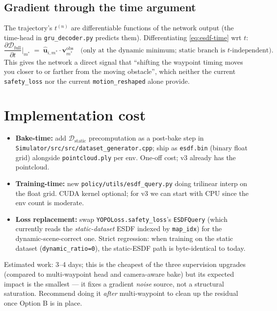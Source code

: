 \documentclass[11pt]{article}
\newcommand{\esdf}{\mathcal{D}}
\begin{document}
\subsection{Gradient through the time argument}

The trajectory's $t^{(n)}$ are differentiable functions of the network output
(the time-head in \texttt{gru\_decoder.py} predicts them). Differentiating
\eqref{eq:esdf-time} wrt $t$:
\begin{equation}
\frac{\partial \esdf_{\text{full}}}{\partial t}\Big|_{m^*}
\;=\;
\hat{\bm{u}}_{i,m^*} \cdot \bm{v}_{m^*}^{\text{obs}}
\quad
\text{(only at the dynamic minimum; static branch is }t\text{-independent)}.
\end{equation}
This gives the network a direct signal that ``shifting the waypoint timing
moves you closer to or farther from the moving obstacle'', which neither the
current \texttt{safety\_loss} nor the current \texttt{motion\_reshaped} alone
provide.

\section{Implementation cost}

\begin{itemize}
  \item \textbf{Bake-time:} add $\esdf_{\text{static}}$ precomputation as a
        post-bake step in \texttt{Simulator/src/src/dataset\_generator.cpp};
        ship as \texttt{esdf.bin} (binary float grid) alongside
        \texttt{pointcloud.ply} per env. One-off cost; v3 already has the
        pointcloud.
  \item \textbf{Training-time:} new \texttt{policy/utils/esdf\_query.py} doing
        trilinear interp on the float grid. CUDA kernel optional; for v3 we
        can start with CPU since the env count is moderate.
  \item \textbf{Loss replacement:} swap \texttt{YOPOLoss.safety\_loss}'s
        \texttt{ESDFQuery} (which currently reads the \emph{static-dataset}
        ESDF indexed by \texttt{map\_idx}) for the dynamic-scene-correct one.
        Strict regression: when training on the static dataset
        (\texttt{dynamic\_ratio=0}), the static-ESDF path is byte-identical
        to today.
\end{itemize}

Estimated work: 3--4 days; this is the cheapest of the three supervision
upgrades (compared to multi-waypoint head and camera-aware bake) but its
expected impact is the smallest --- it fixes a gradient \emph{noise} source,
not a structural saturation. Recommend doing it \emph{after} multi-waypoint to
clean up the residual once Option B is in place.
\end{document}
